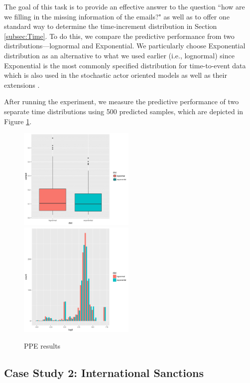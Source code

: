 \documentclass[12pt]{article}
\begin{document}
The goal of this task is to provide an effective answer to the question ``how are we filling in the missing information of the emails?" as well as to offer one standard way to determine the time-increment distribution in Section \ref{subsec:Time}. To do this, we compare the predictive performance from two distributions---lognormal and Exponential. We particularly choose Exponential distribution as an alternative to what we used earlier (i.e., lognormal) since Exponential is the most commonly specified distribution for time-to-event data which is also used in the stochastic actor oriented models \citep{snijders1996stochastic} as well as their extensions \citep{snijders2007modeling}.

After running the experiment, we measure the predictive performance of two separate time distributions using 500 predicted samples, which are depicted in Figure \ref{figure:PPEresults}.
	\begin{figure}[!b]
		\centering
		\includegraphics[width=0.495\textwidth]{plots_paper/senderpredict-1.png}	
		\includegraphics[width=0.495\textwidth]{plots_paper/receiverpredict2-1.png}	
		\caption {PPE results}
		\label{figure:PPEresults}
	\end{figure}
\iffalse
\subsection{Case Study 2: International Sanctions}\label{subsec:International Sanctions}
\end{document}
